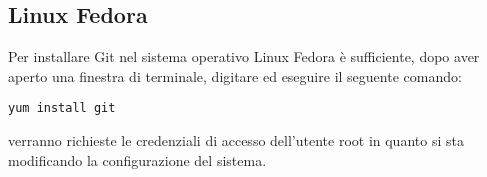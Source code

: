 \subsection{Linux Fedora}
Per installare Git nel sistema operativo Linux Fedora è sufficiente, dopo aver aperto una finestra di terminale, digitare ed eseguire il seguente comando:

\begin{center}
\texttt{yum install git}
\end{center}

verranno richieste le credenziali di accesso dell'utente root in quanto si sta modificando la configurazione del sistema.